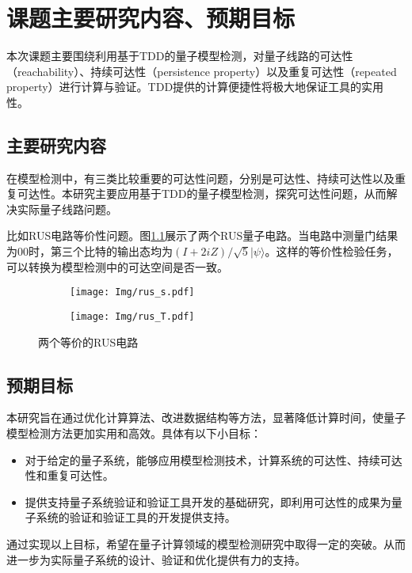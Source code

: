 \chapter{课题主要研究内容、预期目标}
本次课题主要围绕利用基于TDD的量子模型检测，对量子线路的可达性（reachability）、持续可达性（persistence property）以及重复可达性（repeated property）进行计算与验证。TDD提供的计算便捷性将极大地保证工具的实用性。
\section{主要研究内容}
在模型检测中，有三类比较重要的可达性问题，分别是可达性、持续可达性以及重复可达性。本研究主要应用基于TDD的量子模型检测，探究可达性问题，从而解决实际量子线路问题。

比如RUS电路等价性问题。图\ref{fig:rus-equal}展示了两个RUS量子电路。当电路中测量门结果为$00$时，第三个比特的输出态均为$\left(I+2iZ\right)/ \sqrt 5 |\psi\rangle$。这样的等价性检验任务，可以转换为模型检测中的可达空间是否一致。
\begin{figure}[!htbp]
	\centering
	\begin{subfigure}[b]{0.4\textwidth}
        \centering
        \texttt{[image: Img/rus\_s.pdf]}
	\end{subfigure}
	\qquad
	\begin{subfigure}[b]{0.4\textwidth}
        \centering
        \texttt{[image: Img/rus\_T.pdf]}
	\end{subfigure}
	\caption{两个等价的RUS电路\citep{Bocharov_2015}}
	\label{fig:rus-equal}
\end{figure}

\section{预期目标}
本研究旨在通过优化计算算法、改进数据结构等方法，显著降低计算时间，使量子模型检测方法更加实用和高效。具体有以下小目标：
\begin{itemize}
	\item 	对于给定的量子系统，能够应用模型检测技术，计算系统的可达性、持续可达性和重复可达性。
	\item 提供支持量子系统验证和验证工具开发的基础研究，即利用可达性的成果为量子系统的验证和验证工具的开发提供支持。
\end{itemize}
通过实现以上目标，希望在量子计算领域的模型检测研究中取得一定的突破。从而进一步为实际量子系统的设计、验证和优化提供有力的支持。
